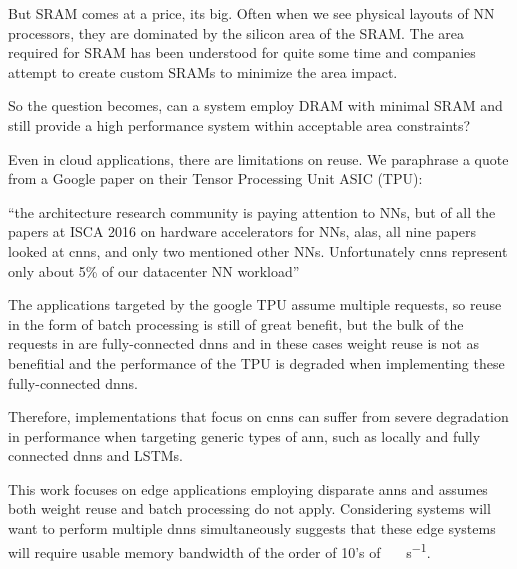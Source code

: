 But SRAM comes at a price, its big. Often when we see physical layouts of NN processors, they are dominated by the silicon area of the SRAM. The area required for SRAM has been understood for quite some time and companies attempt to create custom SRAMs to minimize the area impact.

So the question becomes, can a system employ DRAM with minimal SRAM and still provide a high performance system within acceptable area constraints?

\iffalse
We believe a system can be designed with DRAM as the primary processing store. This will require careful use of data structures to describe storage within DRAM to ensure we make good use of the potential bandwidth. But there are other benefits we will take advantage of, but more about that later.
\fi

\iffalse
There important application is disparate \ac{ann}s because specifically a form of \ac{dnn}, Convolutional Neural networks (\ac{cnn}) have gotten good press recently, but they are not the only \ac{dnn}.
\fi

Even in cloud applications, there are limitations on reuse. We paraphrase a quote from a Google paper \cite{tensorflow2015-whitepaper} on their Tensor Processing Unit ASIC (TPU):

\hyphenquote{american}{the architecture research community is paying attention to NNs, but of all the papers at ISCA 2016 on hardware accelerators for NNs, alas, all nine papers looked at \ac{cnn}s, and only two mentioned other NNs. Unfortunately \ac{cnn}s represent only about 5\% of our datacenter NN workload}

The applications targeted by the google TPU \cite{tensorflow2015-whitepaper} assume multiple requests, so reuse in the form of batch processing is still of great benefit, but the bulk of the requests in \cite{tensorflow2015-whitepaper} are fully-connected \ac{dnn}s and in these cases weight reuse is not as benefitial and the performance of the TPU is degraded when implementing these fully-connected \ac{dnn}s.

Therefore, implementations that focus on \ac{cnn}s can suffer from severe degradation in performance when targeting generic types of \ac{ann}, such as locally and fully connected \ac{dnn}s and LSTMs.

This work focuses on edge applications employing disparate \ac{ann}s and assumes both weight reuse and batch processing do not apply.
Considering systems will want to perform multiple \ac{dnn}s simultaneously suggests that these edge systems will require usable memory bandwidth of the order of 10's of \SI[per-mode=symbol]{}{\tera \bit \per \second}.

